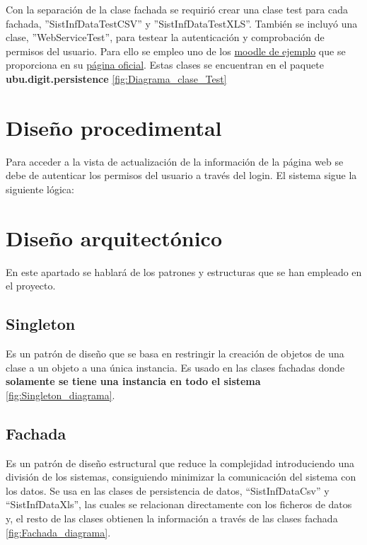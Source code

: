 Con la separación de la clase fachada se requirió crear una clase test para cada fachada, ''SistInfDataTestCSV'' y ''SistInfDataTestXLS''. También se incluyó una clase, ''WebServiceTest'', para testear la autenticación y comprobación de permisos del usuario. Para ello se empleo uno de los \href{https://school.moodledemo.net/}{moodle de ejemplo} que se proporciona en su \href{https://moodle.org/demo}{página oficial}. Estas clases se encuentran en el paquete \textbf{ubu.digit.persistence} \ref{fig:Diagrama_clase_Test}


\section{Diseño procedimental}

Para acceder a la vista de actualización de la información de la página web se debe de autenticar los permisos del usuario a través del login. El sistema sigue la siguiente lógica:	

\section{Diseño arquitectónico}

En este apartado se hablará de los patrones y estructuras que se han empleado en el proyecto.

\subsection{Singleton}
Es un patrón de diseño que se basa en restringir la creación de objetos de una clase a un objeto a una única instancia. Es usado en las clases fachadas donde \textbf{solamente se tiene una instancia en todo el sistema} \ref{fig:Singleton_diagrama}.


\subsection{Fachada}
Es un patrón de diseño estructural que reduce la complejidad introduciendo una división de los sistemas, consiguiendo minimizar la comunicación del sistema con los datos. 
Se usa en las clases de persistencia de datos, ``SistInfDataCsv'' y ``SistInfDataXls'', las cuales se relacionan directamente con los ficheros de datos y, el resto de las clases obtienen la información a través de las clases fachada \ref{fig:Fachada_diagrama}.

